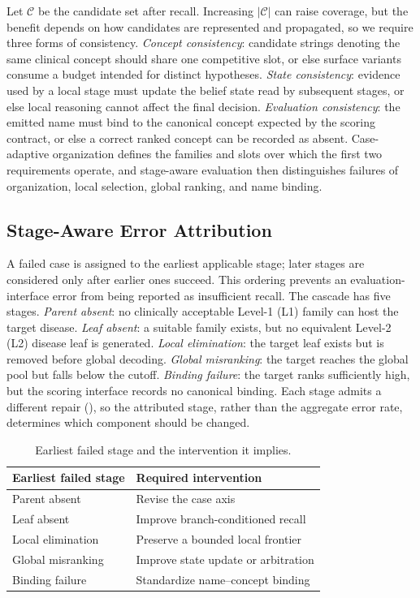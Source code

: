 \documentclass[letterpaper]{article} %
\begin{document}
Let $\mathcal{C}$ be the candidate set after recall.
Increasing $|\mathcal{C}|$ can raise coverage, but the benefit depends on how candidates are represented and propagated, so we require three forms of consistency.
\emph{Concept consistency}: candidate strings denoting the same clinical concept should share one competitive slot, or else surface variants consume a budget intended for distinct hypotheses.
\emph{State consistency}: evidence used by a local stage must update the belief state read by subsequent stages, or else local reasoning cannot affect the final decision.
\emph{Evaluation consistency}: the emitted name must bind to the canonical concept expected by the scoring contract, or else a correct ranked concept can be recorded as absent.
Case-adaptive organization defines the families and slots over which the first two requirements operate, and stage-aware evaluation then distinguishes failures of organization, local selection, global ranking, and name binding.

\subsection{Stage-Aware Error Attribution}
\label{sec:taxonomy}

A failed case is assigned to the earliest applicable stage; later stages are considered only after earlier ones succeed.
This ordering prevents an evaluation-interface error from being reported as insufficient recall.
The cascade has five stages.
\emph{Parent absent}: no clinically acceptable Level-1 (L1) family can host the target disease.
\emph{Leaf absent}: a suitable family exists, but no equivalent Level-2 (L2) disease leaf is generated.
\emph{Local elimination}: the target leaf exists but is removed before global decoding.
\emph{Global misranking}: the target reaches the global pool but falls below the cutoff.
\emph{Binding failure}: the target ranks sufficiently high, but the scoring interface records no canonical binding.
Each stage admits a different repair (), so the attributed stage, rather than the aggregate error rate, determines which component should be changed.

\begin{table}[t]
\centering
\small
\begin{tabular}{@{}ll@{}}
\toprule
Earliest failed stage & Required intervention \\
\midrule
Parent absent & Revise the case axis \\
Leaf absent & Improve branch-conditioned recall \\
Local elimination & Preserve a bounded local frontier \\
Global misranking & Improve state update or arbitration \\
Binding failure & Standardize name--concept binding \\
\bottomrule
\end{tabular}
\caption{Earliest failed stage and the intervention it implies.}
\label{tab:stages}

\end{table}
\end{document}
